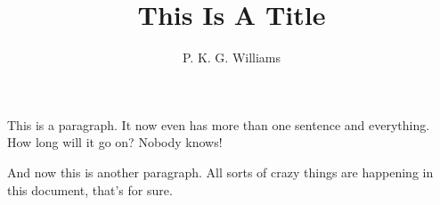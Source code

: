 \documentclass{article}
\title{This Is A Title}
\author{P. K. G. Williams}
\begin{document}
\maketitle

This is a paragraph. It now even has more than one sentence and everything.
How long will it go on? Nobody knows!

And now this is another paragraph. All sorts of crazy things are happening in
this document, that's for sure.
\end{document}

